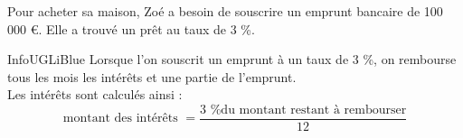 \documentclass[a4paper,11pt,exos]{nsi} %
\begin{document}
\maketitle

Pour acheter sa maison, Zoé a besoin de souscrire un emprunt bancaire de 100 000 €.
Elle a trouvé un prêt au taux de 3 \%.

\begin{encadrecolore}{Info}{UGLiBlue}
    Lorsque l'on souscrit un emprunt à un taux de 3 \%, on rembourse tous les mois les intérêts et une partie de l'emprunt.\\
    Les intérêts sont calculés ainsi :
    $$\text{montant des intérêts }=\dfrac{\text{3 \% du montant restant à rembourser}}{12} $$
\end{encadrecolore}
\end{document}
